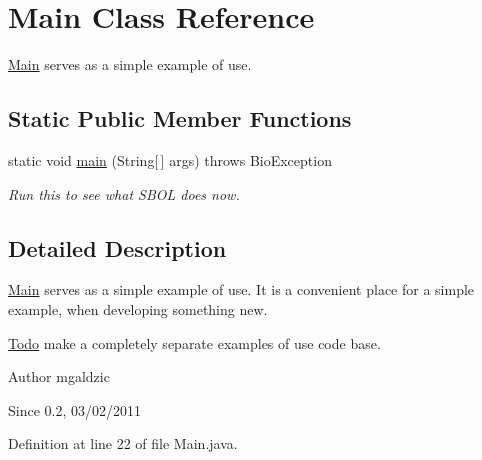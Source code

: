 \hypertarget{classlib_s_b_o_lj_use_example_1_1_main}{
\section{Main Class Reference}
\label{classlib_s_b_o_lj_use_example_1_1_main}
}


\hyperlink{classlib_s_b_o_lj_use_example_1_1_main}{Main} serves as a simple example of use.  


\subsection*{Static Public Member Functions}
\begin{DoxyCompactItemize}
\item 
static void \hyperlink{classlib_s_b_o_lj_use_example_1_1_main_a8b260eecbaabcef8473fd87ada040682}{main} (String\mbox{[}$\,$\mbox{]} args)  throws BioException 
\begin{DoxyCompactList}\small\item\em Run this to see what SBOL does now. \item\end{DoxyCompactList}\end{DoxyCompactItemize}


\subsection{Detailed Description}
\hyperlink{classlib_s_b_o_lj_use_example_1_1_main}{Main} serves as a simple example of use. It is a convenient place for a simple example, when developing something new. \begin{Desc}
\item[\hyperlink{todo__todo000011}{Todo}]make a completely separate examples of use code base.\end{Desc}


\begin{DoxyAuthor}{Author}
mgaldzic 
\end{DoxyAuthor}
\begin{DoxySince}{Since}
0.2, 03/02/2011 
\end{DoxySince}


Definition at line 22 of file Main.java.



